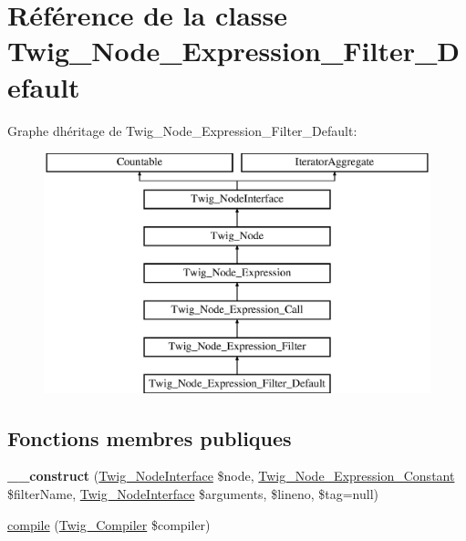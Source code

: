 \hypertarget{class_twig___node___expression___filter___default}{}\section{Référence de la classe Twig\+\_\+\+Node\+\_\+\+Expression\+\_\+\+Filter\+\_\+\+Default}
\label{class_twig___node___expression___filter___default}
Graphe d\textquotesingle{}héritage de Twig\+\_\+\+Node\+\_\+\+Expression\+\_\+\+Filter\+\_\+\+Default\+:\begin{figure}[H]
\begin{center}
\leavevmode
\includegraphics[height=7.000000cm]{class_twig___node___expression___filter___default}
\end{center}
\end{figure}
\subsection*{Fonctions membres publiques}
\begin{DoxyCompactItemize}
\item 
{\bfseries \+\_\+\+\_\+construct} (\hyperlink{interface_twig___node_interface}{Twig\+\_\+\+Node\+Interface} \$node, \hyperlink{class_twig___node___expression___constant}{Twig\+\_\+\+Node\+\_\+\+Expression\+\_\+\+Constant} \$filter\+Name, \hyperlink{interface_twig___node_interface}{Twig\+\_\+\+Node\+Interface} \$arguments, \$lineno, \$tag=null)\hypertarget{class_twig___node___expression___filter___default_a71feda7cd9ef9a14a271f02222d6c9b6}{}\label{class_twig___node___expression___filter___default_a71feda7cd9ef9a14a271f02222d6c9b6}

\item 
\hyperlink{class_twig___node___expression___filter___default_a4e0faa87c3fae583620b84d3607085da}{compile} (\hyperlink{class_twig___compiler}{Twig\+\_\+\+Compiler} \$compiler)
\end{DoxyCompactItemize}

